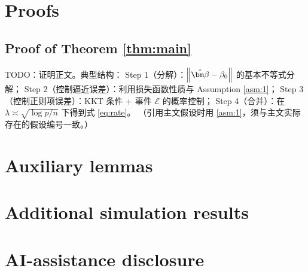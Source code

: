
\section{Proofs}\label{app:proof}

\subsection{Proof of Theorem \ref{thm:main}}\label{app:proof-thm1}
\begin{pf}
TODO：证明正文。典型结构：
Step 1（分解）：$\norm{\betaHat-\beta_0}$ 的基本不等式分解；
Step 2（控制逼近误差）：利用损失函数性质与 Assumption \ref{asm:1}；
Step 3（控制正则项误差）：KKT 条件 + 事件 $\mathcal{E}$ 的概率控制；
Step 4（合并）：在 $\lambda \asymp \sqrt{\log p/n}$ 下得到式 \eqref{eq:rate}。
（引用主文假设时用 \cref{asm:1}，须与主文实际存在的假设编号一致。）
\end{pf}

\section{Auxiliary lemmas}\label{app:lemmas}

\section{Additional simulation results}\label{app:simsim}

\section{AI-assistance disclosure}\label{app:ai-disclosure}
%
%

